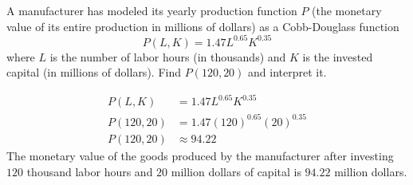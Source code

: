 \begin{exercise}
	A manufacturer has modeled its yearly production function $P$ (the monetary value of its entire production in millions of dollars) as a Cobb-Douglass function
	\begin{equation*}
	P\left( L, K \right) = 1.47L^{0.65}K^{0.35}
	\end{equation*}
	where $L$ is the number of labor hours (in thousands) and $K$ is the invested capital (in millions of dollars). Find $P\left( 120, 20 \right)$ and interpret it.
\end{exercise}
\begin{solution}
	\begin{align*}
	P\left( L, K \right) &= 1.47L^{0.65}K^{0.35} \\
	P\left( 120, 20 \right) &= 1.47\left( 120 \right)^{0.65} \left( 20 \right)^{0.35} \\
	P\left( 120, 20 \right) &\approx 94.22
	\end{align*}
	The monetary value of the goods produced by the manufacturer after investing $120$ thousand labor hours and $20$ million dollars of capital is $94.22$ million dollars.
\end{solution}
